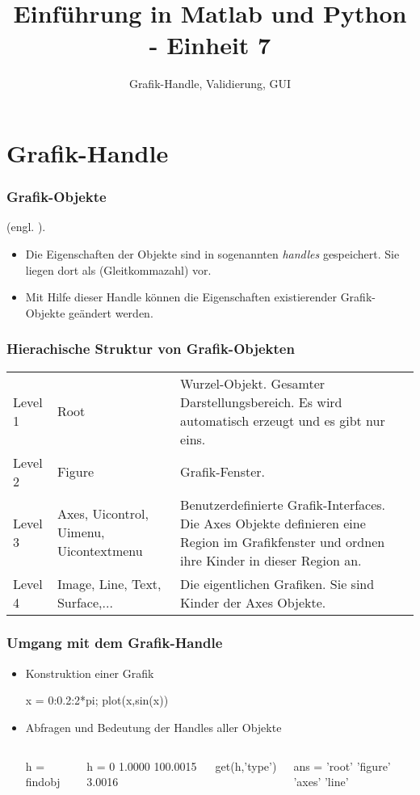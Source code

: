 \documentclass[hyperref={xetex}]{beamer}
\title{Einführung in Matlab und Python - Einheit 7}
\subtitle{Grafik-Handle, Validierung, GUI}
\begin{document}
\titlepage

%
%

\section{Grafik-Handle}
\begin{frame}[fragile]\frametitle{Grafik-Objekte}
(engl. ). 
\begin{itemize}
\item Die Eigenschaften  der Objekte sind  in  sogenannten
{\it handles} gespeichert. Sie liegen dort als 
(Gleitkommazahl) vor.
\item Mit Hilfe dieser Handle können die Eigenschaften 
existierender Grafik-Objekte geändert werden.    
\end{itemize}
\end{frame}
%
%
\begin{frame}[fragile]\frametitle{Hierachische Struktur von Grafik-Objekten}
\begin{tabular}{lp{3cm}p{7cm}}
Level 1 & Root & Wurzel-Objekt. Gesamter Darstellungsbereich. Es wird automatisch erzeugt und es gibt nur eins.\\

Level 2 & Figure & Grafik-Fenster. \\

Level 3 & Axes, Uicontrol, Uimenu, Uicontextmenu & Benutzerdefinierte Grafik-Interfaces. 
Die Axes Objekte definieren eine Region im Grafikfenster und ordnen ihre Kinder in
dieser Region an.\\

Level 4 & Image, Line, Text, Surface,... & Die eigentlichen Grafiken. Sie sind Kinder der Axes Objekte.\\
\end{tabular}
\end{frame}
% 
%
\begin{frame}[fragile]\frametitle{Umgang mit dem Grafik-Handle}
\begin{itemize}
\item Konstruktion einer Grafik
\begin{matlabin}
x = 0:0.2:2*pi;
plot(x,sin(x))
\end{matlabin}
\item Abfragen und Bedeutung der Handles aller Objekte\\
\begin{columns}[t]
\begin{matlabin}
h = findobj
\end{matlabin}
\begin{matlab}
h =
         0
    1.0000
  100.0015
    3.0016
\end{matlab}
\begin{matlabin}
get(h,'type')
\end{matlabin}
\begin{matlab}
ans = 
    'root'
    'figure'
    'axes'
    'line'
\end{matlab} 
\end{columns}
\end{itemize}
\end{frame}
\end{document}
